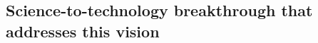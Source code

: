 \documentclass[11pt, a4paper]{article} %
\begin{document}

\subsection{Science-to-technology breakthrough that addresses this vision}
\end{document}
